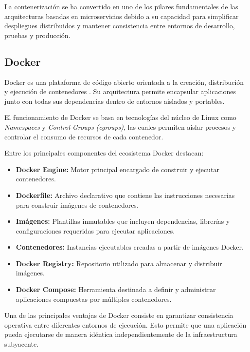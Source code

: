 La contenerización se ha convertido en uno de los pilares fundamentales de las arquitecturas basadas en microservicios debido a su capacidad para simplificar despliegues distribuidos y mantener consistencia entre entornos de desarrollo, pruebas y producción.

\subsection{Docker}

Docker es una plataforma de código abierto orientada a la creación, distribución y ejecución de contenedores \cite{58}. Su arquitectura permite encapsular aplicaciones junto con todas sus dependencias dentro de entornos aislados y portables.

El funcionamiento de Docker se basa en tecnologías del núcleo de Linux como \textit{Namespaces} y \textit{Control Groups (cgroups)}, las cuales permiten aislar procesos y controlar el consumo de recursos de cada contenedor.

Entre los principales componentes del ecosistema Docker destacan:

\begin{itemize}

\item \textbf{Docker Engine:} Motor principal encargado de construir y ejecutar contenedores.

\item \textbf{Dockerfile:} Archivo declarativo que contiene las instrucciones necesarias para construir imágenes de contenedores.

\item \textbf{Imágenes:} Plantillas inmutables que incluyen dependencias, librerías y configuraciones requeridas para ejecutar aplicaciones.

\item \textbf{Contenedores:} Instancias ejecutables creadas a partir de imágenes Docker.

\item \textbf{Docker Registry:} Repositorio utilizado para almacenar y distribuir imágenes.

\item \textbf{Docker Compose:} Herramienta destinada a definir y administrar aplicaciones compuestas por múltiples contenedores.
\end{itemize}

Una de las principales ventajas de Docker consiste en garantizar consistencia operativa entre diferentes entornos de ejecución. Esto permite que una aplicación pueda ejecutarse de manera idéntica independientemente de la infraestructura subyacente.

